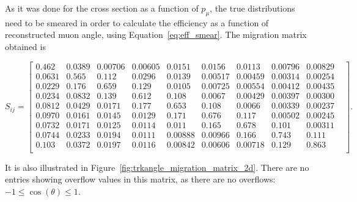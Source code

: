 
As it was done for the cross section as a function of $p_\mu$, the true distributions need to be smeared in order to calculate the efficiency as a function of reconstructed muon angle, using Equation~\ref{eq:eff_smear}. The migration matrix obtained is 
\begin{adjustwidth}{-1cm}{-1cm}
\begin{equation}
S_{ij} =
\begin{bmatrix}
0.462  &  0.0389  &  0.00706  &  0.00605  &  0.0151  &  0.0156  &  0.0113  &  0.00796  &  0.00829  &     \\
0.0631  &  0.565  &  0.112  &  0.0296  &  0.0139  &  0.00517  &  0.00459  &  0.00314  &  0.00254  &     \\
0.0229  &  0.176  &  0.659  &  0.129  &  0.0105  &  0.00725  &  0.00554  &  0.00412  &  0.00435  &     \\
0.0234  &  0.0832  &  0.139  &  0.612  &  0.108  &  0.0067  &  0.00429  &  0.00397  &  0.00300  &     \\
0.0812  &  0.0429  &  0.0171  &  0.177  &  0.653  &  0.108  &  0.0066  &  0.00339  &  0.00237  &     \\
0.0970  &  0.0161  &  0.0145  &  0.0129  &  0.171  &  0.676  &  0.117  &  0.00502  &  0.00245  &     \\
0.0732  &  0.0171  &  0.0125  &  0.0114  &  0.011  &  0.165  &  0.678  &  0.101  &  0.00311  &     \\
0.0744  &  0.0233  &  0.0194  &  0.0111  &  0.00888  &  0.00966  &  0.166  &  0.743  &  0.111  &     \\
0.103  &  0.0372  &  0.0197  &  0.0116  &  0.00842  &  0.00606  &  0.00718  &  0.129  &  0.863  &     \\
\end{bmatrix}.
\end{equation}
\end{adjustwidth}
It is also illustrated in Figure~\ref{fig:trkangle_migration_matrix_2d}. There are no entries showing overflow values in this matrix, as there are no overflows: $-1 \le \cos(\theta) \le 1$.

